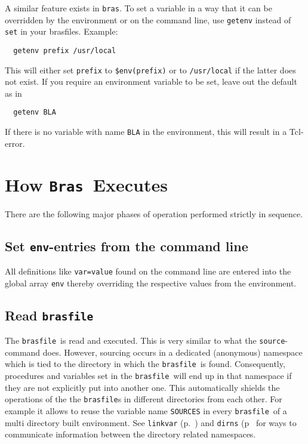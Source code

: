 \documentclass[11pt,bibtotoc,idxtotoc]{scrreprt}
\makeatletter
\newcommand{\bras}{\texttt{bras}}
\newcommand{\Bras}{\texttt{Bras}}
\newcommand{\brasfile}{\texttt{brasfile}}
\newcommand{\Index}[1]{#1\index{#1}}
\newcommand{\Indextt}[1]{\texttt{#1}\index{#1@\texttt{#1}}}
\makeatother
\begin{document}
A similar feature exists in \bras. To set a variable in a way that it
can be overridden by the environment or on the command line, use
\Indextt{getenv} instead of \texttt{set} in your brasfiles. Example:
\begin{verbatim}
  getenv prefix /usr/local
\end{verbatim}
This will either set \texttt{prefix} to \texttt{\$env(prefix)} or to
\texttt{/usr/local} if the latter does not exist. If you require an
environment variable to be set, leave out the default as in
\begin{verbatim}
  getenv BLA
\end{verbatim}
If there is no variable with name
\texttt{BLA} in the environment, this will result in a Tcl-error.

\section{How \Bras\ Executes}
There are the following major phases of operation performed strictly in
sequence.

\subsection{Set \texttt{env}-entries from the command line}
\label{secEnv}
All definitions like \texttt{var=value} found on the command
line are entered into the global array \texttt{env} thereby
overriding the respective values from the environment.

\subsection{Read \texttt{brasfile}}

The \brasfile\ is read and executed. This is very similar to what the
\texttt{source}-command does. However, sourcing occurs in a dedicated
(anonymous) namespace which is tied to the directory in which the
\brasfile\ is found. Consequently, procedures and variables set in the
\brasfile\ will end up in that \Index{namespace} if they are not
explicitly put into another one. This automatically shields the
operations of the the \brasfile{}s in different directories from each
other. For example it allows to reuse the variable name
\texttt{SOURCES} in every \brasfile\ of a multi directory built
environment. See \texttt{linkvar} (p.~\pageref{proc:linkvar}) and
\texttt{dirns} (p~\pageref{proc:dirns} for ways to communicate
information between the directory related namespaces.
\end{document}
